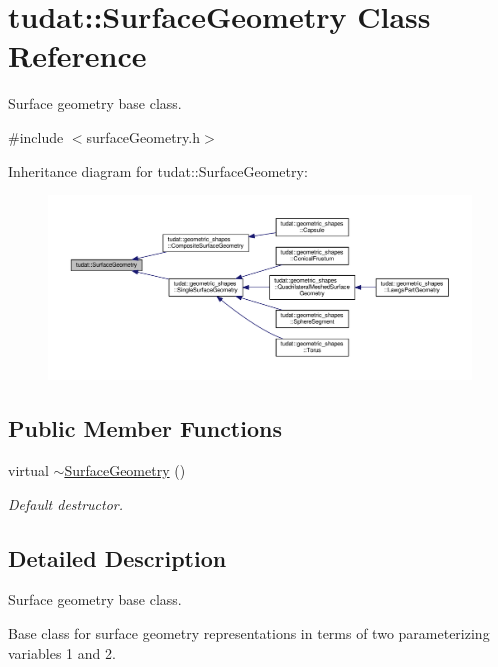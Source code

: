 \hypertarget{classtudat_1_1SurfaceGeometry}{}\section{tudat\+:\+:Surface\+Geometry Class Reference}
\label{classtudat_1_1SurfaceGeometry}


Surface geometry base class.  




{\ttfamily \#include $<$surface\+Geometry.\+h$>$}



Inheritance diagram for tudat\+:\+:Surface\+Geometry\+:
\nopagebreak
\begin{figure}[H]
\begin{center}
\leavevmode
\includegraphics[width=350pt]{classtudat_1_1SurfaceGeometry__inherit__graph}
\end{center}
\end{figure}
\subsection*{Public Member Functions}
\begin{DoxyCompactItemize}
\item 
virtual \hyperlink{classtudat_1_1SurfaceGeometry_ab579812c998e712c009cbe455c0e5692}{$\sim$\+Surface\+Geometry} ()
\begin{DoxyCompactList}\small\item\em Default destructor. \end{DoxyCompactList}\end{DoxyCompactItemize}


\subsection{Detailed Description}
Surface geometry base class. 

Base class for surface geometry representations in terms of two parameterizing variables 1 and 2. 

